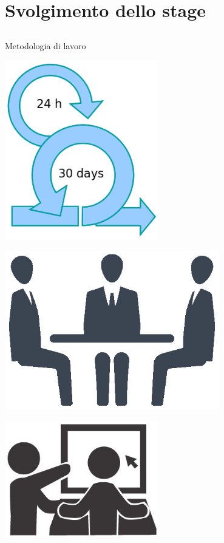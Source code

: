\section{Svolgimento dello stage}
	\subsection{}
		\begin{frame}{Metodologia di lavoro}
			\begin{minipage}{0.49\textwidth}
				\centering
				\includegraphics[width=0.5\textwidth]{capitolo_3/immagini/scrum.png}					
			\end{minipage}
			\begin{minipage}{0.49\textwidth}
				\centering
				\includegraphics[width=0.7\textwidth]{capitolo_3/immagini/meeting.png}
			\end{minipage}\par
			\begin{minipage}{0.49\textwidth}
				\centering
				\includegraphics[width=0.5\textwidth]{capitolo_3/immagini/pair_programming.png}					

\end{minipage}
\end{frame}
